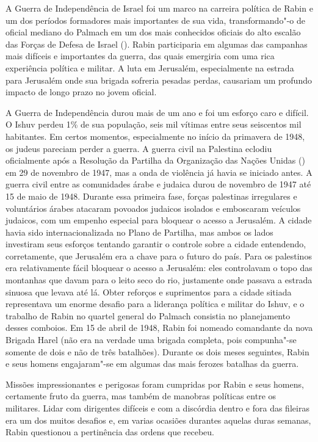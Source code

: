A Guerra de Independência de Israel foi um marco na carreira política de
Rabin e um dos períodos formadores mais importantes de sua vida,
transformando"-o de oficial mediano do Palmach em um dos mais conhecidos
oficiais do alto escalão das Forças de Defesa de Israel (). Rabin participaria em algumas das
campanhas mais difíceis e importantes da guerra, das quais emergiria com uma
rica experiência política e militar. A luta em Jerusalém,
especialmente na estrada para Jerusalém onde sua brigada sofreria
pesadas perdas, causariam um profundo impacto de longo prazo no jovem
oficial.

A Guerra de Independência durou mais de um ano e foi um esforço caro e
difícil. O Ishuv perdeu 1\% de sua população, seis mil vítimas entre seus
seiscentos mil habitantes. Em certos momentos, especialmente no início da
primavera de 1948, os judeus pareciam perder a guerra. A
guerra civil na Palestina eclodiu oficialmente após a Resolução da
Partilha da Organização das Nações Unidas () 
em 29 de novembro de 1947, mas a onda de violência já
havia se iniciado antes. A guerra civil entre as comunidades árabe e
judaica durou de novembro de 1947 até 15 de maio de 1948. Durante essa
primeira fase, forças palestinas irregulares e voluntários árabes
atacaram povoados judaicos isolados e emboscaram veículos judaicos, com
um empenho especial para bloquear o acesso a Jerusalém. A cidade havia
sido internacionalizada no Plano de Partilha, mas ambos os lados
investiram seus esforços tentando garantir o controle sobre a cidade
entendendo, corretamente, que Jerusalém era a chave para o futuro do
país. Para os palestinos era %
relativamente fácil bloquear o acesso a Jerusalém: eles controlavam o
topo das montanhas que davam para o leito seco do rio, justamente onde
passava a estrada sinuosa que levava até lá. Obter reforços e
suprimentos para a cidade sitiada representava um enorme desafio para a
liderança política e militar do Ishuv, e o trabalho de Rabin no quartel
general do Palmach consistia no planejamento desses comboios. Em 15 de
abril de 1948, Rabin foi nomeado comandante da nova Brigada Harel (não
era na verdade uma brigada completa, pois compunha"-se somente de dois e
não de três batalhões). Durante os dois meses seguintes, Rabin e seus
homens engajaram"-se em algumas das mais ferozes batalhas da guerra.

Missões impressionantes e perigosas foram cumpridas por Rabin e seus
homens, certamente fruto da guerra, mas também de manobras políticas
entre os militares. Lidar com dirigentes difíceis e com a discórdia dentro
e fora das fileiras era um dos muitos desafios e, em varias ocasiões
durantes aquelas duras semanas, Rabin questionou a pertinência das
ordens que recebeu.

